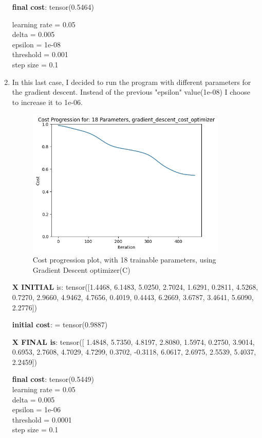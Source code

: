 \documentclass[inscr,ack,preface]{diphdthesis}
\begin{document}
\begin{enumerate}[label=\textbf{\Alph*.}]
\textbf{final cost}: tensor(0.5464)

learning rate =  0.05 \\
delta =  0.005 \\
epsilon =  1e-08 \\
threshold =  0.001 \\
step size =  0.1 \\

\item \textbf{ }
In this last case, I decided to run the program with different parameters for the gradient descent. Instead of the previous "epsilon" value(1e-08) I choose to increase it to 1e-06.
\begin{figure}[H]
\begin{center}
    \includegraphics[width=0.9\textwidth]{epsilon06/18.png}
    \caption{Cost progression plot, with 18 trainable parameters, using Gradient Descent optimizer(C)} 
    \label{fig:enter-label}
    \end{center}
\end{figure}

\textbf{X INITIAL} is:
 tensor([1.4468, 6.1483, 5.0250, 2.7024, 1.6291, 0.2811, 4.5268, 0.7270, 2.9660,
        4.9462, 4.7656, 0.4019, 0.4443, 6.2669, 3.6787, 3.4641, 5.6090, 2.2776])
        
\textbf{initial cost}: = tensor(0.9887)

\textbf{X FINAL is}:
tensor([ 1.4848,  5.7350,  4.8197,  2.8080,  1.5974,  0.2750,  3.9014,  0.6953,
         2.7608,  4.7029,  4.7299,  0.3702, -0.3118,  6.0617,  2.6975,  2.5539,
         5.4037,  2.2459])

\textbf{final cost}: tensor(0.5449)\\

learning rate =  0.05 \\
delta =  0.005 \\
epsilon =  1e-06 \\
threshold =  0.0001\\
step size =  0.1 \\

\end{enumerate}
\end{document}
